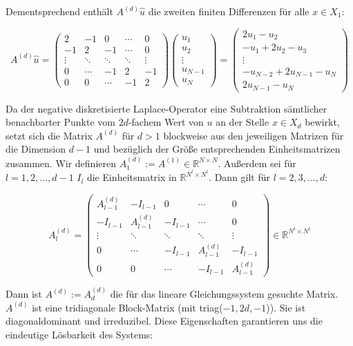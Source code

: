 \documentclass{scrartcl}
\newcommand{\R}{\mathbb{R}}
\begin{document}
Dementsprechend enthält $A^{(d)}\hat{u}$ die zweiten finiten Differenzen für alle $x \in X_1$:

\[A^{(d)}\hat{u}=
\begin{pmatrix}
   2 & -1 &  0 & \cdots & 0 \\
  -1 &  2 & -1 & \cdots & 0 \\
   \vdots & \ddots & \ddots & \ddots & \vdots \\
   0 & \cdots & -1 &  2 & -1 \\
   0 & 0 & \cdots & -1 &  2
\end{pmatrix}
\begin{pmatrix}
  u_1\\
  u_2\\
  \vdots\\
  u_{N-1}\\
  u_N
\end{pmatrix}
=
\begin{pmatrix}
  2u_1-u_2\\
  -u_1+2u_2-u_3\\
  \vdots\\
  -u_{N-2}+2u_{N-1}-u_N\\
  2u_{N-1}-u_N
\end{pmatrix}
\]


Da der negative diskretisierte Laplace-Operator eine Subtraktion sämtlicher benachbarter Punkte vom $2d$-fachem Wert von $u$ an der Stelle $x \in X_d$ bewirkt, setzt sich die Matrix $A^{(d)}$ für $d > 1$ blockweise aus den jeweiligen Matrizen für die Dimension $d-1$ und bezüglich der Größe entsprechenden Einheitsmatrizen zusammen. Wir definieren $A^{(d)}_1 := A^{(1)} \in \R^{N\times N}$. Außerdem sei für $l = 1, 2, ..., d-1$ $I_l$ die Einheitsmatrix in $\R^{N^l \times N^l}$. Dann gilt für $l = 2, 3, ..., d$:

\[A^{(d)}_l=
\begin{pmatrix}
   A^{(d)}_{l-1} & -I_{l-1} &  0 & \cdots & 0 \\
  -I_{l-1} &  A^{(d)}_{l-1} & -I_{l-1} & \cdots & 0 \\
   \vdots & \ddots & \ddots & \ddots & \vdots \\
   0 & \cdots & -I_{l-1} &  A^{(d)}_{l-1} & -I_{l-1} \\
   0 & 0 & \cdots & -I_{l-1} &  A^{(d)}_{l-1}
\end{pmatrix}
\in\R^{N^l \times N^l}
\]

Dann ist $A^{(d)} := A^{(d)}_d$ die für das lineare Gleichungssystem gesuchte Matrix. $A^{(d)}$ ist eine tridiagonale Block-Matrix (mit triag($-1, 2d, -1$)). Sie ist diagonaldominant und irreduzibel. Diese Eigenschaften garantieren uns die eindeutige Lösbarkeit des Systems\cite{rabus2019, rheinbach2015, tischendorf2019}:
\end{document}
